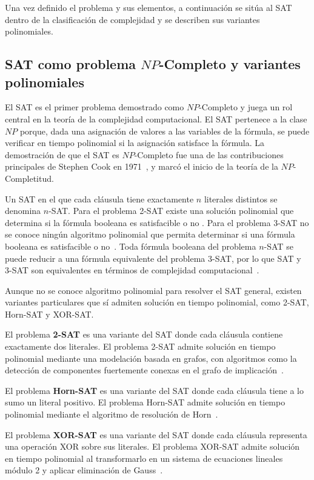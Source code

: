 \documentclass{report}
\theoremstyle{definition}
\theoremstyle{plain}
\theoremstyle{remark}
\begin{document}
Una vez definido el problema y sus elementos, a continuación se sitúa
al SAT dentro de la clasificación de complejidad y se describen sus
variantes polinomiales.

\subsection{SAT como problema $NP$-Completo y variantes polinomiales}
\label{sec:sat-variantes}

El SAT es el primer problema demostrado como $NP$-Completo y juega un
rol central en la teoría de la complejidad computacional. El SAT pertenece a la clase
$NP$ porque, dada una asignación de valores a las variables de la
fórmula, se puede verificar en tiempo polinomial si la asignación
satisface la fórmula. La demostración de que el SAT es $NP$-Completo
fue una de las contribuciones principales de Stephen Cook en
1971~\cite{cook1971}, y marcó el inicio de la teoría de la
$NP$-Completitud.

Un SAT en el que cada cláusula tiene exactamente $n$ literales distintos
se denomina $n$-SAT. Para el problema 2-SAT existe una solución
polinomial que determina si la fórmula booleana es satisfacible o no
\cite{halim2013cp3}. Para el problema 3-SAT no se conoce ningún
algoritmo polinomial que permita determinar si una fórmula booleana es
satisfacible o no~\cite{hopcroft2006introduction}. Toda fórmula booleana
del problema $n$-SAT se puede reducir a una fórmula equivalente del
problema 3-SAT, por lo que SAT y 3-SAT son equivalentes en términos de
complejidad computacional~\cite{hopcroft2006introduction}.

Aunque no se conoce algoritmo polinomial para resolver el SAT general,
existen variantes particulares que sí admiten solución en tiempo polinomial,
como 2-SAT, Horn-SAT y XOR-SAT.

El problema \textbf{2-SAT} es una variante del SAT donde cada cláusula
contiene exactamente dos literales. El problema 2-SAT admite solución
en tiempo polinomial mediante una modelación basada en grafos, con
algoritmos como la detección de componentes fuertemente conexas en el
grafo de implicación~\cite{halim2013cp3}.

El problema \textbf{Horn-SAT} es una variante del SAT donde cada
cláusula tiene a lo sumo un literal positivo. El problema Horn-SAT
admite solución en tiempo polinomial mediante el algoritmo de
resolución de Horn~\cite{dowling1984horn}.

El problema \textbf{XOR-SAT} es una variante del SAT donde cada
cláusula representa una operación XOR sobre sus literales. El
problema XOR-SAT admite solución en tiempo polinomial al
transformarlo en un sistema de ecuaciones lineales módulo 2 y aplicar
eliminación de Gauss~\cite{schaefer1978}.
\end{document}
